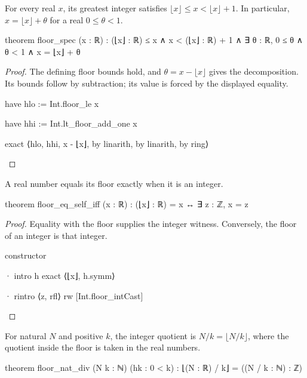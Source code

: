 \begin{theorem}
  \label{ent:thm:floor-spec}
  For every real $x$, its greatest integer satisfies $\lfloor x\rfloor\le x<\lfloor x\rfloor+1$.
  In particular, $x=\lfloor x\rfloor+\theta$ for a real $0\le\theta<1$.

  \begin{lean}
    theorem floor_spec (x : ℝ) :
        (⌊x⌋ : ℝ) ≤ x ∧ x < (⌊x⌋ : ℝ) + 1 ∧
          ∃ θ : ℝ, 0 ≤ θ ∧ θ < 1 ∧ x = ⌊x⌋ + θ
  \end{lean}
\end{theorem}

\begin{proof}
  The defining floor bounds hold, and $\theta=x-\lfloor x\rfloor$ gives the decomposition.
  Its bounds follow by subtraction; its value is forced by the displayed equality.

  \begin{lean}
    have hlo := Int.floor_le x

    have hhi := Int.lt_floor_add_one x

    exact ⟨hlo, hhi, x - ⌊x⌋, by linarith, by linarith, by ring⟩
  \end{lean}
\end{proof}

\begin{theorem}
  \label{ent:thm:floor-eq-self-iff}
  A real number equals its floor exactly when it is an integer.

  \begin{lean}
    theorem floor_eq_self_iff (x : ℝ) : (⌊x⌋ : ℝ) = x ↔ ∃ z : ℤ, x = z
  \end{lean}
\end{theorem}

\begin{proof}
  Equality with the floor supplies the integer witness.
  Conversely, the floor of an integer is that integer.

  \begin{lean}
    constructor

    · intro h
      exact ⟨⌊x⌋, h.symm⟩

    · rintro ⟨z, rfl⟩
      rw [Int.floor_intCast]
  \end{lean}
\end{proof}

\begin{theorem}
  \label{ent:thm:floor-nat-div}
  For natural $N$ and positive $k$, the integer quotient is $N/k=\lfloor N/k\rfloor$, where the
  quotient inside the floor is taken in the real numbers.

  \begin{lean}
    theorem floor_nat_div (N k : ℕ) (hk : 0 < k) :
        ⌊(N : ℝ) / k⌋ = ((N / k : ℕ) : ℤ)
  \end{lean}
\end{theorem}

